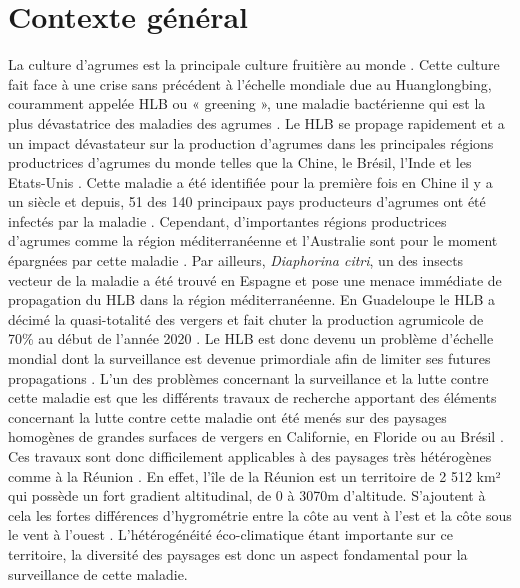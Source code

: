\documentclass[
  11pt,
  french,
  a4paper,
  extrafontsizes,onecolumn,openright
  ]{memoir}
\begin{document}
\vspace*{4cm}

\hypertarget{contexte-guxe9nuxe9ral}{%
\section{Contexte général}\label{contexte-guxe9nuxe9ral}}

La culture d'agrumes est la principale culture fruitière au monde \autocite{comte_apport_2013}. Cette culture fait face à une crise sans précédent à l'échelle mondiale due au Huanglongbing, couramment appelée HLB ou « greening », une maladie bactérienne qui est la plus dévastatrice des maladies des agrumes \autocite{moriya_detecting_2019}. Le HLB se propage rapidement et a un impact dévastateur sur la production d'agrumes dans les principales régions productrices d'agrumes du monde telles que la Chine, le Brésil, l'Inde et les Etats-Unis \autocite{deng_detection_2020}. Cette maladie a été identifiée pour la première fois en Chine il y a un siècle et depuis, 51 des 140 principaux pays producteurs d'agrumes ont été infectés par la maladie \autocite{moriya_detecting_2019}. Cependant, d'importantes régions productrices d'agrumes comme la région méditerranéenne et l'Australie sont pour le moment épargnées par cette maladie \autocite{gutierrez_prospective_2013}. Par ailleurs, \emph{Diaphorina citri}, un des insects vecteur de la maladie a été trouvé en Espagne et pose une menace immédiate de propagation du HLB dans la région méditerranéenne. En Guadeloupe le HLB a décimé la quasi-totalité des vergers et fait chuter la production agrumicole de 70\% au début de l'année 2020 \autocite{morillon_huanglongbing_2020}. Le HLB est donc devenu un problème d'échelle mondial dont la surveillance est devenue primordiale afin de limiter ses futures propagations \autocite{wang_citrus_2019}.
\vfill
\newpage
L'un des problèmes concernant la surveillance et la lutte contre cette maladie est que les différents travaux de recherche apportant des éléments concernant la lutte contre cette maladie ont été menés sur des paysages homogènes de grandes surfaces de vergers en Californie, en Floride ou au Brésil \autocite{narouei-khandan_global_2016}.
Ces travaux sont donc difficilement applicables à des paysages très hétérogènes comme à la Réunion \autocite{gottwald_current_2010}.
En effet, l'île de la Réunion est un territoire de 2 512 km² qui possède un fort gradient altitudinal, de 0 à 3070m d'altitude. S'ajoutent à cela les fortes différences d'hygrométrie entre la côte au vent à l'est et la côte sous le vent à l'ouest \autocite{guilloteau_utilisation_2018}. L'hétérogénéité éco-climatique étant importante sur ce territoire, la diversité des paysages est donc un aspect fondamental pour la surveillance de cette maladie.
\end{document}
